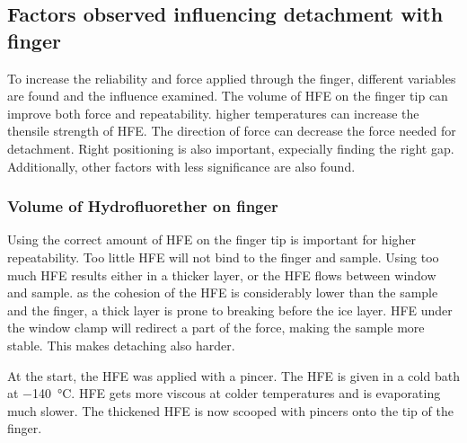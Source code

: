 \subsection{Factors observed influencing detachment with finger}

To increase the reliability and force applied through the finger, different variables are found and the influence examined. The volume of HFE on the finger tip can improve both force and repeatability. higher temperatures can increase the thensile strength of HFE. The direction of force can decrease the force needed for detachment. Right positioning is also important, expecially finding the right gap. Additionally, other factors with less significance are also found.



\subsubsection{Volume of Hydrofluorether on finger}


Using the correct amount of HFE on the finger tip is important for higher repeatability. Too little HFE will not bind to the finger and sample. Using too much HFE results either in a thicker layer, or the HFE flows between window and sample. as the cohesion of the HFE is considerably lower than the sample and the finger, a thick layer is prone to breaking before the ice layer. HFE under the window clamp will redirect a part of the force, making the sample more stable. This makes detaching also harder.

At the start, the HFE was applied with a pincer. The HFE is given in a cold bath at \SI{-140}{\degreeCelsius}. HFE gets more viscous at colder temperatures and is evaporating much slower. The thickened HFE is now scooped with pincers onto the tip of the finger.

